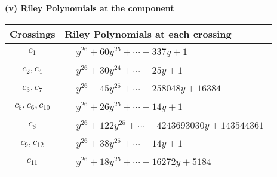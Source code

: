 \documentclass[1p]{elsarticle_modified}
\theoremstyle{definition}
\begin{document}
\newpage\renewcommand{\arraystretch}{1}
\flushleft \textbf{(v) Riley Polynomials at the component}\newline \\
\begin{tabular}{m{50pt}|m{274pt}}
Crossings & \hspace{64pt}Riley Polynomials at each crossing \\
\hline $$\begin{aligned}c_{1}\end{aligned}$$&$\begin{aligned}
&y^{26}+60 y^{25}+\cdots-337 y+1
\end{aligned}$\\
\hline $$\begin{aligned}c_{2},c_{4}\end{aligned}$$&$\begin{aligned}
&y^{26}+30 y^{24}+\cdots-25 y+1
\end{aligned}$\\
\hline $$\begin{aligned}c_{3},c_{7}\end{aligned}$$&$\begin{aligned}
&y^{26}-45 y^{25}+\cdots-258048 y+16384
\end{aligned}$\\
\hline $$\begin{aligned}c_{5},c_{6},c_{10}\end{aligned}$$&$\begin{aligned}
&y^{26}+26 y^{25}+\cdots-14 y+1
\end{aligned}$\\
\hline $$\begin{aligned}c_{8}\end{aligned}$$&$\begin{aligned}
&y^{26}+122 y^{25}+\cdots-4243693030 y+143544361
\end{aligned}$\\
\hline $$\begin{aligned}c_{9},c_{12}\end{aligned}$$&$\begin{aligned}
&y^{26}+38 y^{25}+\cdots-14 y+1
\end{aligned}$\\
\hline $$\begin{aligned}c_{11}\end{aligned}$$&$\begin{aligned}
&y^{26}+18 y^{25}+\cdots-16272 y+5184
\end{aligned}$\\
\hline
\end{tabular}\\~\\
\end{document}
